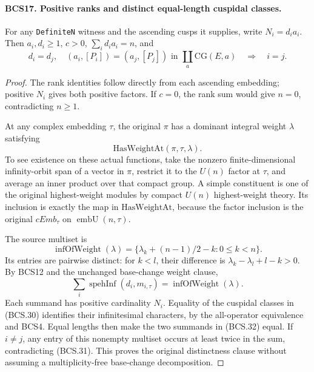 \documentclass[11pt,a4paper]{article}
\numberwithin{equation}{section}
\theoremstyle{remark}\newtheorem{remark}[theorem]{Remark}
\begin{document}
\paragraph{BCS17. Positive ranks and distinct equal-length cuspidal classes.}
\label{claim:BCS17}
For any \texttt{Definite\allowbreak N} witness and the ascending cusps it
supplies, write \(N_i=d_i a_i\).  Then \(a_i,d_i\ge1\),
\(c>0\), \(\sum_i d_i a_i=n\), and
\[
 d_i=d_j,\quad
 (a_i,[P_i])=(a_j,[P_j])\text{ in }\coprod_a\mathrm{CG}(E,a)
                         \quad\Longrightarrow\quad i=j.
 \tag{BCS.30}
\]
\begin{proof}
The rank identities follow directly from each ascending embedding;
positive \(N_i\) gives both positive factors.  If \(c=0\), the
rank sum would give \(n=0\), contradicting \(n\ge1\).

At any complex embedding \(\tau\), the original \(\pi\) has a
dominant integral weight \(\lambda\) satisfying
\[
                    \mathrm{HasWeightAt}(\pi,\tau,\lambda).
\]
To see existence
on these actual functions, take the nonzero finite-dimensional
infinity-orbit span of a vector in \(\pi\), restrict it to the
\(U(n)\) factor at \(\tau\), and average an inner product over
that compact group.  A simple constituent is one of the original
highest-weight modules by compact \(U(n)\) highest-weight theory.
Its inclusion is exactly the map in \(\mathrm{HasWeightAt}\),
because the factor inclusion is the original \(cEmb_\tau\)
on \(\operatorname{embU}(n,\tau)\).

The source multiset is
\[
 \operatorname{infOfWeight}(\lambda)=
       \{\lambda_k+(n-1)/2-k:0\le k<n\}.
 \tag{BCS.31}
\]
Its entries are pairwise distinct: for \(k<l\), their difference
is \(\lambda_k-\lambda_l+l-k>0\).  By BCS12 and the unchanged
base-change weight clause,
\[
 \sum_i\operatorname{spehInf}(d_i,m_{i,\tau})
                           =\operatorname{infOfWeight}(\lambda).
 \tag{BCS.32}
\]
Each summand has positive cardinality \(N_i\).  Equality of the
cuspidal classes in (BCS.30) identifies their infinitesimal
characters, by the all-operator equivalence and BCS4.  Equal lengths
then make the two summands in (BCS.32) equal.  If \(i\ne j\),
any entry of this nonempty multiset occurs at least twice in the
sum, contradicting (BCS.31).  This proves the original distinctness
clause without assuming a multiplicity-free base-change decomposition.
\end{proof}

\end{document}
